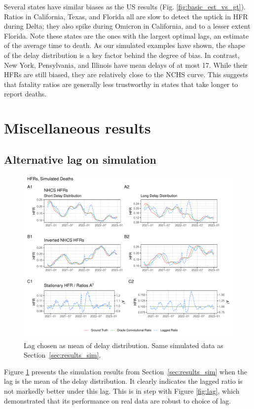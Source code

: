 \documentclass{article}
\begin{document}
Several states have similar biases as the US results (Fig. \ref{fig:basic_est_vs_gt}). Ratios in California, Texas, and Florida all are slow to detect the uptick in HFR during Delta; they also spike during Omicron in California, and to a lesser extent Florida. Note these states are the ones with the largest optimal lags, an estimate of the average time to death. As our simulated examples have shown, the shape of the delay distribution is a key factor behind the degree of bias. In contrast, New York, Pensylvania, and Illinois have mean delays of at most 17. While their HFRs are still biased, they are relatively close to the NCHS curve. This suggests that fatality ratios are generally less trustworthy in states that take longer to report deaths.

\section{Miscellaneous results}\label{apx:misc}
\subsection{Alternative lag on simulation}
\begin{figure}
    \centering
    \includegraphics[width=\linewidth]{Figs/Simulated/simulated_results_corr_lag.pdf}
    \caption{Lag chosen as mean of delay distribution. Same simulated data as Section~\ref{sec:results_sim}.}
    \label{fig:sims_mean_lag}
\end{figure}

Figure \ref{fig:sims_mean_lag} presents the simulation results from Section~\ref{sec:results_sim} when the lag is the mean of the delay distribution. It clearly indicates the lagged ratio is not markedly better under this lag. This is in step with Figure \ref{fig:lag}, which demonstrated that its performance on real data are robust to choice of lag.
\end{document}
